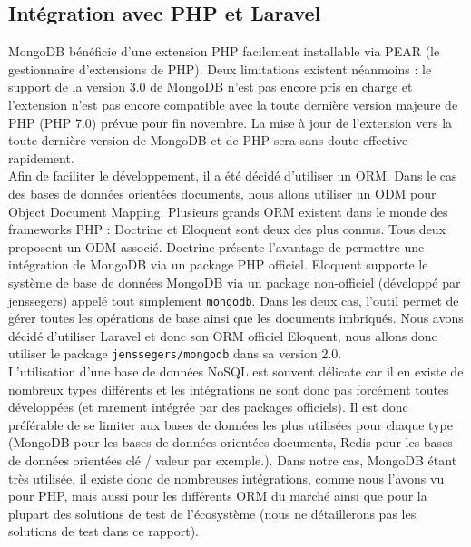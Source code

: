 \subsection{Intégration avec PHP et Laravel} %
\label{sub:integration_avec_php_et_laravel}

	MongoDB bénéficie d'une extension PHP facilement installable via PEAR (le gestionnaire d'extensions de PHP). Deux limitations existent néanmoins : le support de la version 3.0 de MongoDB n'est pas encore pris en charge et l'extension n'est pas encore compatible avec la toute dernière version majeure de PHP (PHP 7.0) prévue pour fin novembre. La mise à jour de l'extension vers la toute dernière version de MongoDB et de PHP sera sans doute effective rapidement.\\

	Afin de faciliter le développement, il a été décidé d'utiliser un ORM. Dans le cas des bases de données orientées documents, nous allons utiliser un ODM pour Object Document Mapping. Plusieurs grands ORM existent dans le monde des frameworks PHP : Doctrine et Eloquent sont deux des plus connus. Tous deux proposent un ODM associé. Doctrine présente l'avantage de permettre une intégration de MongoDB via un package PHP officiel. Eloquent supporte le système de base de données MongoDB via un package non-officiel (développé par jenssegers) appelé tout simplement \verb|mongodb|. Dans les deux cas, l'outil permet de gérer toutes les opérations de base ainsi que les documents imbriqués. Nous avons décidé d'utiliser Laravel et donc son ORM officiel Eloquent, nous allons donc utiliser le package \verb|jenssegers/mongodb| dans sa version 2.0.\\

	L'utilisation d'une base de données NoSQL est souvent délicate car il en existe de nombreux types différents et les intégrations ne sont donc pas forcément toutes développées (et rarement intégrée par des packages officiels). Il est donc préférable de se limiter aux bases de données les plus utilisées pour chaque type (MongoDB pour les bases de données orientées documents, Redis pour les bases de données orientées clé / valeur par exemple.). Dans notre cas, MongoDB étant très utilisée, il existe donc de nombreuses intégrations, comme nous l'avons vu pour PHP, mais aussi pour les différents ORM du marché ainsi que pour la plupart des solutions de test de l'écosystème (nous ne détaillerons pas les solutions de test dans ce rapport).


